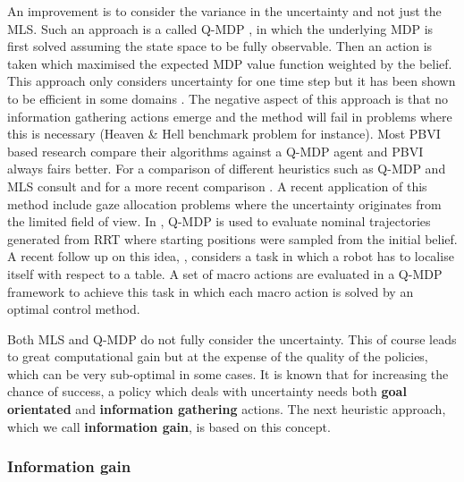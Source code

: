 An improvement is to consider the variance in the uncertainty and not just the MLS. Such an approach is a called Q-MDP \cite{Littman95}, \cite{RL_book_sa} in which the underlying MDP is first solved assuming the state space to be fully observable. Then an action is taken which maximised the expected MDP value function weighted by the belief. This approach only considers uncertainty for one time step but it has been shown to be efficient in some domains \cite[Chap. 16]{Thrun_2005}. 
The negative aspect of this approach is that no information gathering actions emerge and the method will fail in problems where this is necessary (Heaven \& Hell benchmark problem for instance). Most PBVI based research compare their algorithms against a Q-MDP agent and PBVI always fairs better. 
For a comparison of different heuristics such as Q-MDP and MLS consult \cite{acting_uncer_1996} and for a more recent comparison \cite{qmdp_ijcnn_2014}. 
A recent application of this method include gaze allocation problems \cite{where_look_2012} where the uncertainty originates from the limited field of view.  
In \cite{Hauser_2011}, Q-MDP is used to evaluate nominal trajectories generated from RRT where starting positions were sampled from the initial belief.
A recent follow up on this idea, \cite{pomdp_iros_tous_2015}, considers a task in which a robot has to localise itself with respect to a table. 
A set of macro actions are evaluated in a Q-MDP framework to achieve this task in which each macro action is solved by an optimal control method.

Both MLS and Q-MDP do not fully consider the uncertainty. This of course leads to great computational gain but 
at the expense of the quality of the policies, which can be very sub-optimal in some cases. It is known that for 
increasing the chance of success, a policy which deals with uncertainty needs both \textbf{goal orientated} and \textbf{information gathering} actions. 
The next heuristic approach, which we call \textbf{information gain}, is based on this concept.

\subsubsection{Information gain}

